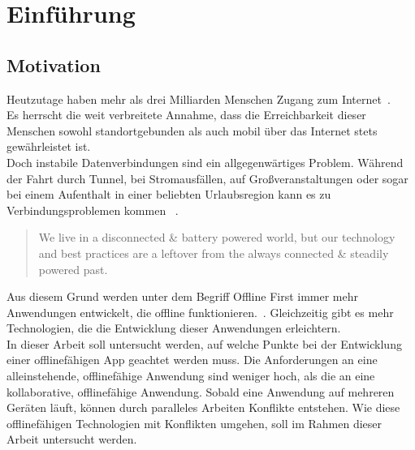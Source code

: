 \chapter{\label{chap:einleitung}Einführung}
\section{Motivation}

Heutzutage haben mehr als drei Milliarden Menschen Zugang zum Internet~\cite{dev-report}.\\
Es herrscht die weit verbreitete Annahme, dass die Erreichbarkeit dieser Menschen sowohl standortgebunden als auch mobil über das Internet stets gewährleistet ist.\\
Doch instabile Datenverbindungen sind ein allgegenwärtiges Problem. Während der Fahrt durch Tunnel, bei Stromausfällen, auf Großveranstaltungen oder sogar bei einem Aufenthalt in einer beliebten Urlaubsregion kann es zu Verbindungsproblemen kommen ~\cite{offline_ux, ndr}.\vspace{0.3cm}
\begin{quote}
	We live in a disconnected \& battery powered world, but our technology and best practices are a leftover from the always connected \& steadily powered past.
	\cite{offlinefirst}\vspace{0.3cm}
\end{quote}
%
Aus diesem Grund werden unter dem Begriff Offline First immer mehr Anwendungen entwickelt, die offline funktionieren.~\cite{heise}.
Gleichzeitig gibt es mehr Technologien, die die Entwicklung dieser Anwendungen erleichtern.\\
In dieser Arbeit soll untersucht werden, auf welche Punkte bei der Entwicklung einer offlinefähigen \gls{App} geachtet werden muss.
Die Anforderungen an eine alleinstehende, offlinefähige Anwendung sind weniger hoch, als die an eine kollaborative, offlinefähige Anwendung.
Sobald eine Anwendung auf mehreren Geräten läuft, können durch paralleles Arbeiten Konflikte entstehen.
Wie diese offlinefähigen Technologien mit Konflikten umgehen, soll im Rahmen dieser Arbeit untersucht werden.
%
%
\clearpage
